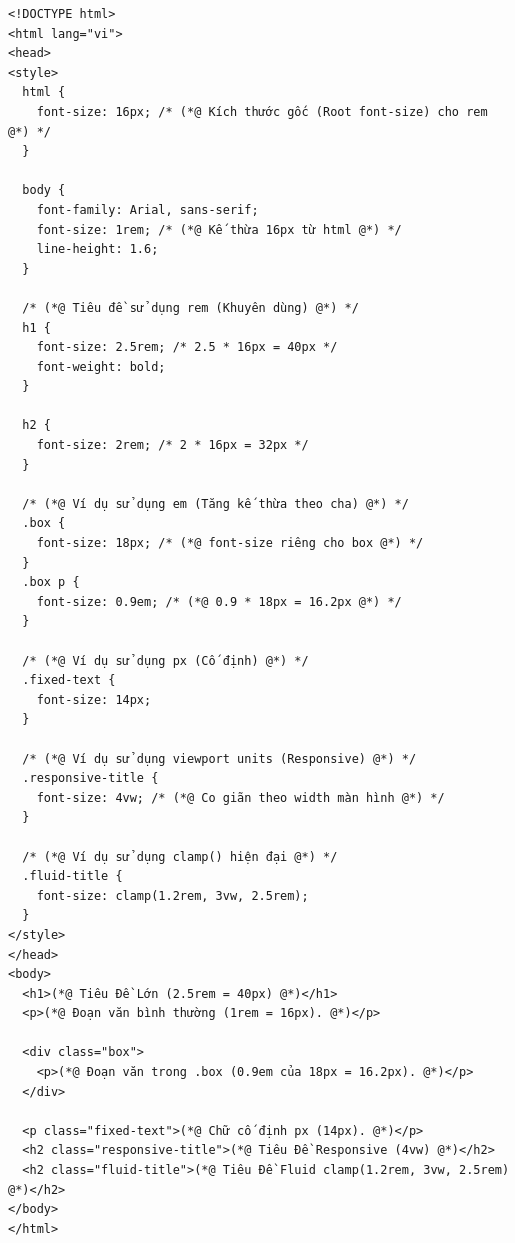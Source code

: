 \documentclass[11pt,oneside]{book}
\begin{document}
\begin{codeWindow}
\begin{lstlisting}[language=HTML5]
<!DOCTYPE html>
<html lang="vi">
<head>
<style>
  html {
    font-size: 16px; /* (*@ Kích thước gốc (Root font-size) cho rem @*) */
  }

  body {
    font-family: Arial, sans-serif;
    font-size: 1rem; /* (*@ Kế thừa 16px từ html @*) */
    line-height: 1.6;
  }

  /* (*@ Tiêu đề sử dụng rem (Khuyên dùng) @*) */
  h1 {
    font-size: 2.5rem; /* 2.5 * 16px = 40px */
    font-weight: bold;
  }

  h2 {
    font-size: 2rem; /* 2 * 16px = 32px */
  }

  /* (*@ Ví dụ sử dụng em (Tăng kế thừa theo cha) @*) */
  .box {
    font-size: 18px; /* (*@ font-size riêng cho box @*) */
  }
  .box p {
    font-size: 0.9em; /* (*@ 0.9 * 18px = 16.2px @*) */
  }

  /* (*@ Ví dụ sử dụng px (Cố định) @*) */
  .fixed-text {
    font-size: 14px;
  }

  /* (*@ Ví dụ sử dụng viewport units (Responsive) @*) */
  .responsive-title {
    font-size: 4vw; /* (*@ Co giãn theo width màn hình @*) */
  }

  /* (*@ Ví dụ sử dụng clamp() hiện đại @*) */
  .fluid-title {
    font-size: clamp(1.2rem, 3vw, 2.5rem);
  }
</style>
</head>
<body>
  <h1>(*@ Tiêu Đề Lớn (2.5rem = 40px) @*)</h1>
  <p>(*@ Đoạn văn bình thường (1rem = 16px). @*)</p>
  
  <div class="box">
    <p>(*@ Đoạn văn trong .box (0.9em của 18px = 16.2px). @*)</p>
  </div>
  
  <p class="fixed-text">(*@ Chữ cố định px (14px). @*)</p>
  <h2 class="responsive-title">(*@ Tiêu Đề Responsive (4vw) @*)</h2>
  <h2 class="fluid-title">(*@ Tiêu Đề Fluid clamp(1.2rem, 3vw, 2.5rem) @*)</h2>
</body>
</html>
\end{lstlisting}
\end{codeWindow}
\end{document}

